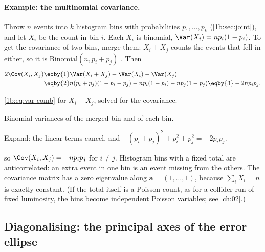 \paragraph{Example: the multinomial covariance.}
Throw $n$ events into $k$ histogram bins with probabilities $p_1,\dots,p_k$
(\cref{1b:sec:joint}), and let $X_i$ be the count in bin $i$. Each $X_i$ is
binomial, $\Var(X_i)=np_i(1-p_i)$. To get the covariance of two bins, merge
them: $X_i+X_j$ counts the events that fell in either, so it is
$\mathrm{Binomial}(n,p_i+p_j)$ . Then
\begin{align*}
  2\Cov(X_i,X_j)
  &\eqby{1} \Var(X_i+X_j)-\Var(X_i)-\Var(X_j)\\
  &\eqby{2} n(p_i+p_j)(1-p_i-p_j)-np_i(1-p_i)-np_j(1-p_j)
   \eqby{3} -2np_ip_j ,
\end{align*}
\begin{explain}
  \item \eqref{1b:eq:var-comb} for $X_i+X_j$, solved for the covariance.
  \item Binomial variances of the merged bin and of each bin.
  \item Expand: the linear terms cancel, and
        $-(p_i+p_j)^2+p_i^2+p_j^2=-2p_ip_j$.
\end{explain}
so $\Cov(X_i,X_j)=-np_ip_j$ for $i\neq j$. Histogram bins with a fixed total
are anticorrelated: an extra event in one bin is an event missing from the
others. The covariance matrix has a zero eigenvalue along $\bm a=(1,\dots,1)$,
because $\sum_iX_i=n$ is exactly constant. (If the total itself is a Poisson
count, as for a collider run of fixed luminosity, the bins become
independent Poisson variables; see \cref{ch:02}.)

\subsection{Diagonalising: the principal axes of the error ellipse}

